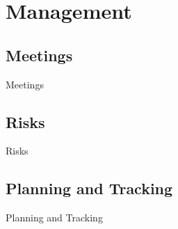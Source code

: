 \newpage
\section{Management}

\subsection{Meetings}
Meetings

\subsection{Risks}
Risks

\subsection{Planning and Tracking}
Planning and Tracking
